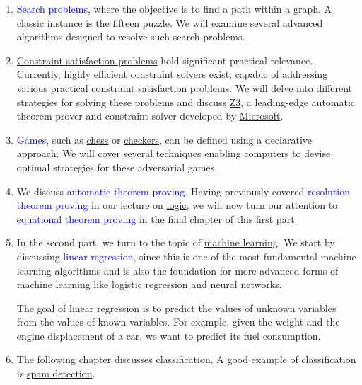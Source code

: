 \begin{enumerate}
\item \textcolor{blue}{Search problems}, where the objective is to find a path within a graph. A classic
      instance is the \href{https://en.wikipedia.org/wiki/15_puzzle}{fifteen puzzle}. We will examine several
      advanced algorithms designed to resolve such search problems. 
\item \href{https://en.wikipedia.org/wiki/Constraint_satisfaction_problem}{Constraint satisfaction
      problems} hold significant practical relevance. Currently, highly efficient constraint solvers exist,
      capable of addressing various practical constraint satisfaction problems. We will delve into different
      strategies for solving these problems and discuss \href{https://github.com/Z3Prover/z3}{Z3}, a
      leading-edge automatic theorem prover and constraint solver developed by
      \href{https://www.microsoft.com/en-us/research/project/z3-3/}{Microsoft}. 
\item \textcolor{blue}{Games}, such as \href{https://en.wikipedia.org/wiki/Chess}{chess} or
      \href{https://en.wikipedia.org/wiki/checkers}{checkers}, can be defined using a declarative
      approach. We will cover several techniques enabling computers to devise optimal strategies for these
      adversarial games. 
\item We discuss \textcolor{blue}{automatic theorem proving}. Having previously covered
      \textcolor{blue}{resolution theorem proving} in our lecture on
      \href{https://github.com/karlstroetmann/Logic}{logic}, we will now turn our attention to
      \textcolor{blue}{equational theorem proving} in the final chapter of this first part. 
\item In the second part, we turn to the topic of
      \href{https://en.wikipedia.org/wiki/Machine_learning}{machine learning}.
      We start by discussing \textcolor{blue}{linear regression}, since this is one of the most fundamental machine
      learning algorithms and is also the foundation for more advanced
      forms of machine learning like \href{https://en.wikipedia.org/wiki/Logistic_regression}{logistic regression} and 
      \href{https://en.wikipedia.org/wiki/Artificial_neural_network}{neural networks}.

      The goal of linear regression is to predict the values of unknown variables from the values of known
      variables.  For example, given the weight and the engine displacement of a car, we want to predict its
      fuel consumption.      
\item The following chapter discusses
      \href{https://en.wikipedia.org/wiki/Statistical_classification}{classification}.  A good example of
      classification is \href{https://en.wikipedia.org/wiki/Anti-spam_techniques#Detecting_spam}{spam detection}. 


\end{enumerate}
